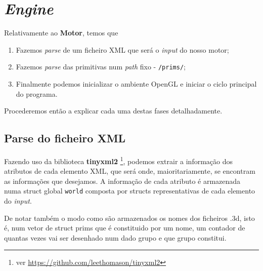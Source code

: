 \documentclass[14pt, a4 paper]{article}
\begin{document}
\section{\textit{Engine}} \label{chap:engine}
Relativamente ao \textbf{Motor}, temos que 
\begin{enumerate}
    \item Fazemos \textit{parse} de um ficheiro XML que será o \textit{input} do nosso motor;
    \item Fazemos \textit{parse} das primitivas num \textit{path} fixo - \verb|/prims/|;
    \item Finalmente podemos inicializar o ambiente OpenGL e iniciar o ciclo principal do programa.
\end{enumerate}

Procederemos então a explicar cada uma destas fases detalhadamente.

\subsection{Parse do ficheiro XML}

Fazendo uso da biblioteca \textbf{tinyxml2} \footnote{ver \url{https://github.com/leethomason/tinyxml2}}, podemos extrair a informação dos atributos de cada elemento XML, que será onde, maioritariamente, se encontram as informações que desejamos. A informação de cada atributo \'e armazenada numa struct global
\verb|world| composta por structs representativas de cada elemento do \textit{input}.

De notar também o modo como são armazenados os nomes dos ficheiros .3d, isto é, num vetor de struct prims que é constituido por um nome, um contador de quantas vezes vai ser desenhado num dado grupo e que grupo constitui.  
\end{document}
